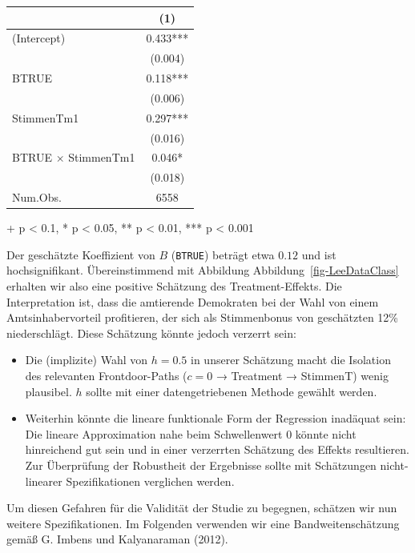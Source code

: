 \documentclass[
  a4paper,
  DIV=11,
  oneside]{scrreprt}
\newenvironment{Shaded}{\begin{snugshade}}{\end{snugshade}}
\newcommand{\AttributeTok}[1]{\textcolor[rgb]{0.40,0.45,0.13}{#1}}
\newcommand{\CommentTok}[1]{\textcolor[rgb]{0.37,0.37,0.37}{#1}}
\newcommand{\FunctionTok}[1]{\textcolor[rgb]{0.28,0.35,0.67}{#1}}
\newcommand{\NormalTok}[1]{\textcolor[rgb]{0.00,0.23,0.31}{#1}}
\newcommand{\OtherTok}[1]{\textcolor[rgb]{0.00,0.23,0.31}{#1}}
\newcommand{\SpecialCharTok}[1]{\textcolor[rgb]{0.37,0.37,0.37}{#1}}
\begin{document}
\setlength{\LTpost}{0mm}
\begin{longtable*}{lc}
\toprule
  & (1) \\ 
\midrule\addlinespace[2.5pt]
(Intercept) & 0.433*** \\ 
 & (0.004) \\ 
BTRUE & 0.118*** \\ 
 & (0.006) \\ 
StimmenTm1 & 0.297*** \\ 
 & (0.016) \\ 
BTRUE × StimmenTm1 & 0.046* \\ 
 & (0.018) \\ 
Num.Obs. & 6558 \\ 
\bottomrule
\end{longtable*}
\begin{minipage}{\linewidth}
+ p < 0.1, * p < 0.05, ** p < 0.01, *** p < 0.001\\
\end{minipage}

Der geschätzte Koeffizient von \(B\) (\texttt{BTRUE}) beträgt etwa
\(0.12\) und ist hochsignifikant. Übereinstimmend mit Abbildung
Abbildung~\ref{fig-LeeDataClass} erhalten wir also eine positive
Schätzung des Treatment-Effekts. Die Interpretation ist, dass die
amtierende Demokraten bei der Wahl von einem Amtsinhabervorteil
profitieren, der sich als Stimmenbonus von geschätzten 12\%
niederschlägt. Diese Schätzung könnte jedoch verzerrt sein:

\begin{itemize}
\item
  Die (implizite) Wahl von \(h=0.5\) in unserer Schätzung macht die
  Isolation des relevanten Frontdoor-Paths (\(c=0\) → Treatment →
  StimmenT) wenig plausibel. \(h\) sollte mit einer datengetriebenen
  Methode gewählt werden.
\item
  Weiterhin könnte die lineare funktionale Form der Regression inadäquat
  sein: Die lineare Approximation nahe beim Schwellenwert 0 könnte nicht
  hinreichend gut sein und in einer verzerrten Schätzung des Effekts
  resultieren. Zur Überprüfung der Robustheit der Ergebnisse sollte mit
  Schätzungen nicht-linearer Spezifikationen verglichen werden.
\end{itemize}

Um diesen Gefahren für die Validität der Studie zu begegnen, schätzen
wir nun weitere Spezifikationen. Im Folgenden verwenden wir eine
Bandweitenschätzung gemäß G. Imbens und Kalyanaraman (2012).

\begin{Shaded}
\end{Shaded}
\end{document}
